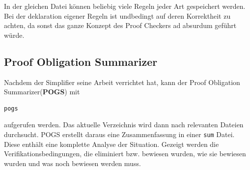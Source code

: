 In der gleichen Datei können beliebig viele Regeln jeder Art gespeichert werden.
Bei der deklaration eigener Regeln ist undbedingt auf deren Korrektheit zu achten, da sonst das ganze Konzept des Proof Checkers ad absurdum geführt würde.

\subsection{Proof Obligation Summarizer}
Nachdem der Simplifier seine Arbeit verrichtet hat, kann der Proof Obligation Summarizer(\textbf{POGS}) mit
\begin{verbatim}
pogs
\end{verbatim}
aufgerufen werden. Das aktuelle Verzeichnis wird dann nach relevanten Dateien durchsucht. POGS erstellt daraus eine Zusammenfassung in einer \texttt{sum} Datei. Diese enthält eine komplette Analyse der Situation. Gezeigt werden die Verifikationsbedingungen, die eliminiert bzw. bewiesen wurden, wie sie bewiesen wurden und was noch bewiesen werden muss.